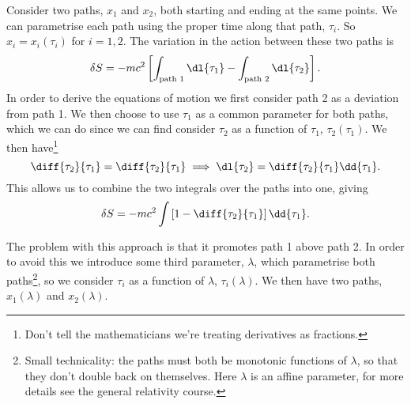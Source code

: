 Consider two paths, \(x_1\) and \(x_2\), both starting and ending at the same points.
We can parametrise each path using the proper time along that path, \(\tau_i\).
So \(x_i = x_i(\tau_i)\) for \(i = 1, 2\).
The variation in the action between these two paths is
\begin{equation}
    \delta S = -mc^2 \left[ \int_{\text{path 1}} \dl{\tau_1} - \int_{\text{path 2}} \dl{\tau_2} \right].
\end{equation}
In order to derive the equations of motion we first consider path 2 as a deviation from path 1.
We then choose to use \(\tau_1\) as a common parameter for both paths, which we can do since we can find consider \(\tau_2\) as a function of \(\tau_1\), \(\tau_2(\tau_1)\).
We then have\footnote{Don't tell the mathematicians we're treating derivatives as fractions.}
\begin{equation}
    \diff{\tau_2}{\tau_1} = \diff{\tau_2}{\tau_1} \implies \dl{\tau_2} = \diff{\tau_2}{\tau_1}\dd{\tau_1}.
\end{equation}
This allows us to combine the two integrals over the paths into one, giving
\begin{equation}
    \delta S = -mc^2\int \left[ 1 - \diff{\tau_2}{\tau_1} \right]\dd{\tau_1}.
\end{equation}

The problem with this approach is that it promotes path 1 above path 2.
In order to avoid this we introduce some third parameter, \(\lambda\), which parametrise both paths\footnote{Small technicality: the paths must both be monotonic functions of \(\lambda\), so that they don't double back on themselves. Here \(\lambda\) is an affine parameter, for more details see the general relativity course.}, so we consider \(\tau_i\) as a function of \(\lambda\), \(\tau_i(\lambda)\).
We then have two paths, \(x_1(\lambda)\) and \(x_2(\lambda)\).


